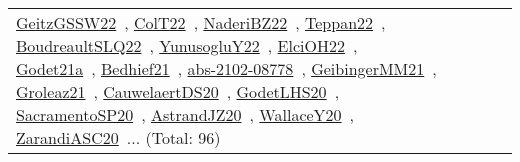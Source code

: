 {\begin{longtable}{lp{3cm}>{\raggedright\arraybackslash}p{6cm}>{\raggedright\arraybackslash}p{6cm}>{\raggedright\arraybackslash}p{8cm}}
\href{../works/GeitzGSSW22.pdf}{GeitzGSSW22}~\cite{GeitzGSSW22}, \href{../works/ColT22.pdf}{ColT22}~\cite{ColT22}, \href{../works/NaderiBZ22.pdf}{NaderiBZ22}~\cite{NaderiBZ22}, \href{../works/Teppan22.pdf}{Teppan22}~\cite{Teppan22}, \href{../works/BoudreaultSLQ22.pdf}{BoudreaultSLQ22}~\cite{BoudreaultSLQ22}, \href{../works/YunusogluY22.pdf}{YunusogluY22}~\cite{YunusogluY22}, \href{../works/ElciOH22.pdf}{ElciOH22}~\cite{ElciOH22}, \href{../works/Godet21a.pdf}{Godet21a}~\cite{Godet21a}, \href{../works/Bedhief21.pdf}{Bedhief21}~\cite{Bedhief21}, \href{../works/abs-2102-08778.pdf}{abs-2102-08778}~\cite{abs-2102-08778}, \href{../works/GeibingerMM21.pdf}{GeibingerMM21}~\cite{GeibingerMM21}, \href{../works/Groleaz21.pdf}{Groleaz21}~\cite{Groleaz21}, \href{../works/CauwelaertDS20.pdf}{CauwelaertDS20}~\cite{CauwelaertDS20}, \href{../works/GodetLHS20.pdf}{GodetLHS20}~\cite{GodetLHS20}, \href{../works/SacramentoSP20.pdf}{SacramentoSP20}~\cite{SacramentoSP20}, \href{../works/AstrandJZ20.pdf}{AstrandJZ20}~\cite{AstrandJZ20}, \href{../works/WallaceY20.pdf}{WallaceY20}~\cite{WallaceY20}, \href{../works/ZarandiASC20.pdf}{ZarandiASC20}~\cite{ZarandiASC20}... (Total: 96)\\

\end{longtable}}

